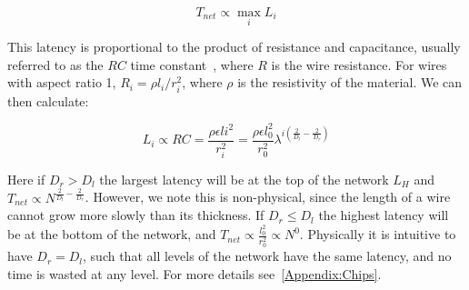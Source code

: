 \documentclass[12pt]{article}
\begin{document}

\begin{equation}
  T_{net} \propto \max_{i} L_i
\end{equation}

This latency is proportional to the product of resistance and capacitance,
usually referred to as the $RC$ time constant~\cite{bakoglu90}, where $R$ is
the wire resistance.  For wires with aspect ratio 1, $R_i = \rho l_i /r_i^2$,
where $\rho$ is the resistivity of the material. We can then calculate:

\begin{equation}
  L_i \propto RC = \frac{\rho \epsilon li^2}{r_i^2} = \frac{\rho \epsilon
  l_0^2}{r_0^2} \lambda^{i\left(\frac{2}{D_l} - \frac{2}{D_r}\right)}
\end{equation}

Here if $D_r>D_l$ the largest latency will be at the top of the network $L_H$
and $T_{net} \propto N^{\frac{2}{D_l} - \frac{2}{D_r}}$. However, we note this is
non-physical, since the length of a wire cannot grow more slowly than its
thickness. If $D_r\leq D_l$ the highest latency will be at the bottom of the
network, and $T_{net} \propto \frac{l_0^2}{r_0^2} \propto N^0$. Physically it
is intuitive to have $D_r=D_l$, such that all levels of the network have the
same latency, and no time is wasted at any level. For more details
see~\ref{Appendix:Chips}.
\end{document}

